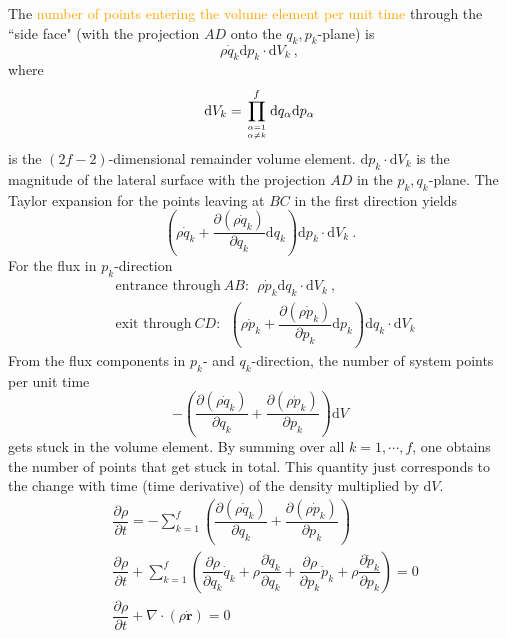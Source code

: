 \documentclass[11pt,a4paper]{article}
\renewcommand{\vec}[1]{\boldsymbol{#1}}
\newcommand{\dif}{\mathrm{d}}
\begin{document}
The \textcolor{orange}{number of points entering the volume element per unit time} through the ``side face" (with the projection $AD$ onto the $q_k, p_k$-plane) is
\begin{equation*}
\rho \dot{q}_k \dif p_k \cdot \dif V_k ~,
\end{equation*}
where
\begin{equation*}
\dif V_k = \prod^f_{\alpha = 1 \atop \alpha \neq k} \dif q_\alpha \dif p_\alpha 
\end{equation*}
is the $(2f - 2)$-dimensional remainder volume element. $\dif p_k \cdot \dif V_k$ is the magnitude of the lateral surface with the projection $AD$ in the $p_k, q_k$-plane. The Taylor expansion for the points leaving at $BC$ in the first direction yields
\begin{equation*}
\left( \rho \dot{q}_k + \dfrac{\partial (\rho \dot{q}_k)}{\partial q_k}  \dif q_k \right) \dif p_k \cdot \dif V_k ~.
\end{equation*}
For the flux in $p_k$-direction
\begin{align*}
& \text{entrance through} ~AB : ~~ \rho \dot{p}_k \dif q_k \cdot \dif V_k ~, \\ 
& \text{exit through} ~CD : ~~ \left( \rho \dot{p}_k + \dfrac{\partial (\rho \dot{p}_k)}{\partial p_k}  \dif p_k \right) \dif q_k \cdot \dif V_k
\end{align*}
From the flux components in $p_k$- and $q_k$-direction, the number of system points per unit time
\begin{equation}
-\left(\dfrac{\partial (\rho \dot{q}_k)}{\partial q_k} +\dfrac{\partial (\rho \dot{p}_k)}{\partial p_k} \right) \dif V
\end{equation}
gets stuck in the volume element. By summing over all $k = 1, \cdots , f$, one obtains the number of points that get stuck
in total. This quantity just corresponds to the change with time (time derivative) of the density multiplied by $\dif V$.
\begin{align}
& \dfrac{\partial \rho}{ \partial t} = -\sum_{k=1}^f \left(\dfrac{\partial (\rho \dot{q}_k)}{\partial q_k} +\dfrac{\partial (\rho \dot{p}_k)}{\partial p_k} \right) \\
& \dfrac{\partial \rho}{ \partial t} + \sum_{k=1}^f \left(\dfrac{\partial \rho}{\partial q_k} \dot{q}_k +\rho \dfrac{\partial \dot{q}_k}{\partial q_k} +\dfrac{\partial \rho}{\partial p_k}\dot{p}_k +\rho \dfrac{\partial \dot{p}_k}{\partial p_k} \right) = 0 \\
\nonumber & \dfrac{\partial \rho}{ \partial t} + \nabla \cdot (\rho \dot{\vec{r}}) = 0 
\end{align}
\end{document}
